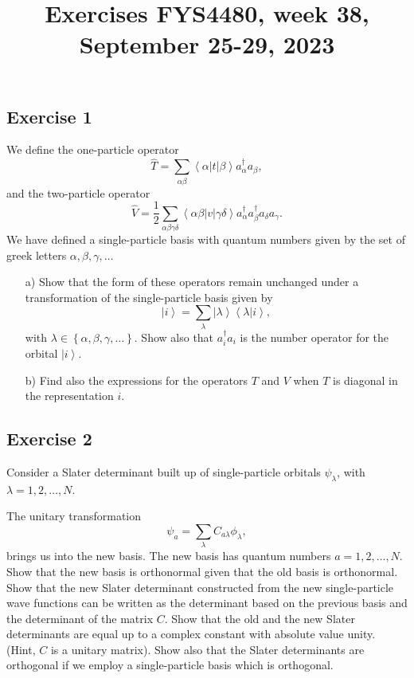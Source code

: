 \documentclass[prc]{revtex4}
\newcommand{\bra}[1]{\left\langle #1 \right|}
\newcommand{\ket}[1]{\left| #1 \right\rangle}
\begin{document}
\title{Exercises FYS4480, week 38, September 25-29, 2023}
\maketitle



\subsection*{Exercise 1}
We define the one-particle operator
\[
\hat{T}={\displaystyle
\sum_{\alpha\beta}}\bra{\alpha}t\ket{\beta}a_{\alpha}^
{\dagger}a_{\beta},
\]
and the two-particle operator
\[
\hat{V}=
\frac{1}{2}{\displaystyle
\sum_{\alpha\beta\gamma\delta}}\bra{\alpha\beta}
v\ket{\gamma\delta}a_{\alpha}^{\dagger}a_{\beta}^{\dagger}
a_{\delta}a_{\gamma}.
\]
We have defined a single-particle basis with quantum numbers given by the set of greek letters $\alpha,\beta,\gamma,\dots$

\begin{enumerate}
\item[a)] Show that the form of these operators remain unchanged under 
a transformation  of the single-particle basis given by 
\[
\ket{i}=\sum_{\lambda}\ket{\lambda}\left\langle \lambda | i \right\rangle,
\]
with $\lambda\in \left\{\alpha,\beta,\gamma,\dots\right\}$. 
Show also that
$a_{i}^{\dagger}a_{i}$ is the number operator
for  the orbital $\ket{i}$. 
\item[b)] Find also the expressions for the operators
$T$ and $V$ when $T$ is diagonal in the representation
$i$. 
\end{enumerate}



\subsection*{Exercise 2}
Consider a Slater determinant built up of single-particle orbitals $\psi_{\lambda}$, 
with $\lambda = 1,2,\dots,N$.

The unitary transformation
\[
\psi_a  = \sum_{\lambda} C_{a\lambda}\phi_{\lambda},
\]
brings us into the new basis.  
The new basis has quantum numbers $a=1,2,\dots,N$.
Show that the new basis is orthonormal given that the old basis is orthonormal.
Show that the new Slater determinant constructed from the new single-particle wave functions can be
written as the determinant based on the previous basis and the determinant of the matrix $C$.
Show that the old and the new Slater determinants are equal up to a complex constant with absolute value unity.
(Hint, $C$ is a unitary matrix).  Show also that the Slater determinants are orthogonal if we employ a single-particle basis which is orthogonal.
\end{document}
